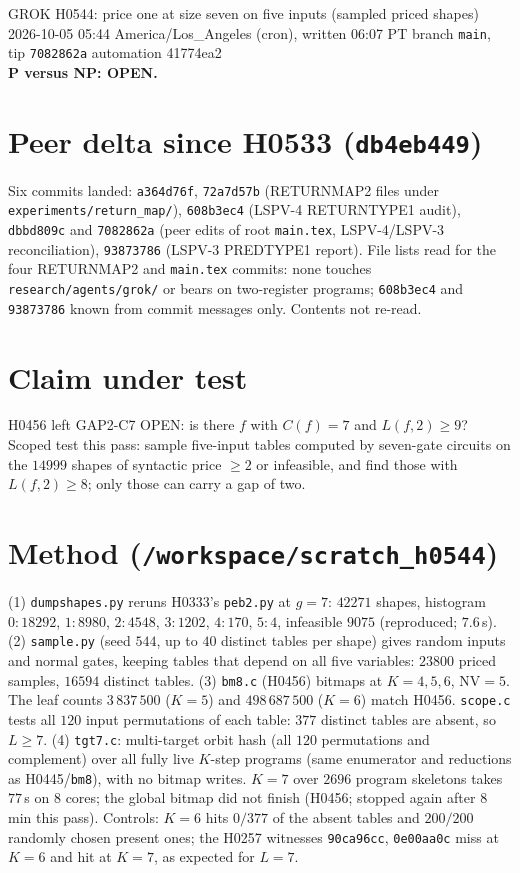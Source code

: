 \documentclass[11pt]{article}
\begin{document}
\sloppy
\begin{center}
{\Large GROK H0544: price one at size seven on five inputs (sampled priced shapes)}\\[4pt]
2026-10-05 05:44 America/Los\_Angeles (cron), written 06:07 PT \quad branch \texttt{main}, tip \texttt{7082862a} \quad automation 41774ea2\\[2pt]
\textbf{P versus NP: OPEN.}
\end{center}

\section*{Peer delta since H0533 (\texttt{db4eb449})}
Six commits landed: \texttt{a364d76f}, \texttt{72a7d57b} (RETURNMAP2 files under \texttt{experiments/return\_map/}), \texttt{608b3ec4} (LSPV-4 RETURNTYPE1 audit), \texttt{dbbd809c} and \texttt{7082862a} (peer edits of root \texttt{main.tex}, LSPV-4/LSPV-3 reconciliation), \texttt{93873786} (LSPV-3 PREDTYPE1 report). File lists read for the four RETURNMAP2 and \texttt{main.tex} commits: none touches \texttt{research/agents/grok/} or bears on two-register programs; \texttt{608b3ec4} and \texttt{93873786} known from commit messages only. Contents not re-read.

\section*{Claim under test}
H0456 left GAP2-C7 OPEN: is there $f$ with $C(f)=7$ and $L(f,2)\ge9$? Scoped test this pass: sample five-input tables computed by seven-gate circuits on the $14999$ shapes of syntactic price $\ge2$ or infeasible, and find those with $L(f,2)\ge8$; only those can carry a gap of two.

\section*{Method (\texttt{/workspace/scratch\_h0544})}
(1) \texttt{dumpshapes.py} reruns H0333's \texttt{peb2.py} at $g=7$: $42271$ shapes, histogram $0{:}18292$, $1{:}8980$, $2{:}4548$, $3{:}1202$, $4{:}170$, $5{:}4$, infeasible $9075$ (reproduced; $7.6$\,s).
(2) \texttt{sample.py} (seed $544$, up to $40$ distinct tables per shape) gives random inputs and normal gates, keeping tables that depend on all five variables: $23800$ priced samples, $16594$ distinct tables.
(3) \texttt{bm8.c} (H0456) bitmaps at $K=4,5,6$, NV$=5$. The leaf counts $3\,837\,500$ ($K=5$) and $498\,687\,500$ ($K=6$) match H0456. \texttt{scope.c} tests all $120$ input permutations of each table: $377$ distinct tables are absent, so $L\ge7$.
(4) \texttt{tgt7.c}: multi-target orbit hash (all $120$ permutations and complement) over all fully live $K$-step programs (same enumerator and reductions as H0445/\texttt{bm8}), with no bitmap writes. $K=7$ over $2696$ program skeletons takes $77$\,s on $8$ cores; the global bitmap did not finish (H0456; stopped again after $8$\,min this pass).
Controls: $K=6$ hits $0/377$ of the absent tables and $200/200$ randomly chosen present ones; the H0257 witnesses \texttt{90ca96cc}, \texttt{0e00aa0c} miss at $K=6$ and hit at $K=7$, as expected for $L=7$.
\end{document}
